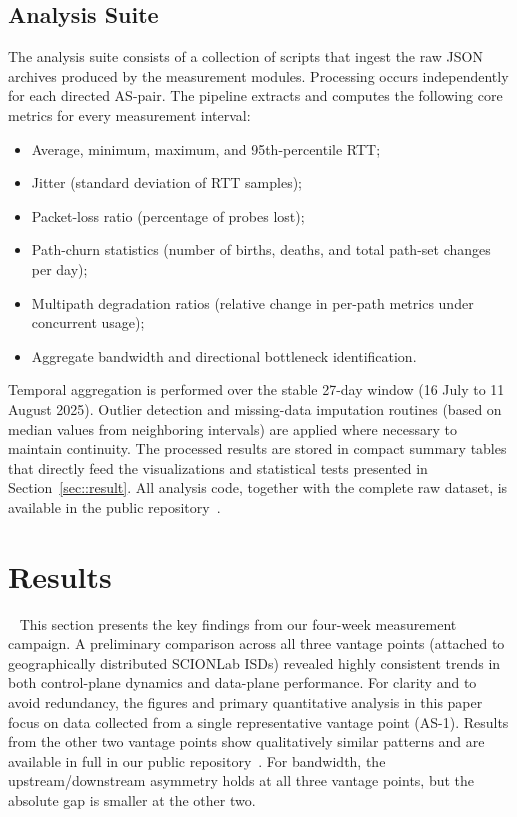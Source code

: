 \documentclass[pdflatex,sn-vancouver-num]{sn-jnl}%
\theoremstyle{thmstyleone}%
\theoremstyle{thmstyletwo}%
\theoremstyle{thmstylethree}%
\begin{document}
\subsection{Analysis Suite}
    The analysis suite consists of a collection of scripts that ingest the raw JSON archives produced by the measurement modules. Processing occurs independently for each directed AS-pair. The pipeline extracts and computes the following core metrics for every measurement interval:
    \begin{itemize}
    \item Average, minimum, maximum, and 95th-percentile RTT;
    \item Jitter (standard deviation of RTT samples);
    \item Packet-loss ratio (percentage of probes lost);
    \item Path-churn statistics (number of births, deaths, and total path-set changes per day);
    \item Multipath degradation ratios (relative change in per-path metrics under concurrent usage);
    \item Aggregate bandwidth and directional bottleneck identification.
\end{itemize}
    Temporal aggregation is performed over the stable 27-day window (16 July to 11 August 2025). Outlier detection and missing-data imputation routines (based on median values from neighboring intervals) are applied where necessary to maintain continuity. The processed results are stored in compact summary tables that directly feed the visualizations and statistical tests presented in Section~\ref{sec::result}. All analysis code, together with the complete raw dataset, is available in the public repository~\cite{github-scionlab-data}.


\section{Results}~\label{sec::result}
This section presents the key findings from our four-week measurement campaign. A preliminary comparison across all three vantage points (attached to geographically distributed SCIONLab ISDs) revealed highly consistent trends in both control-plane dynamics and data-plane performance. For clarity and to avoid redundancy, the figures and primary quantitative analysis in this paper focus on data collected from a single representative vantage point (AS-1). Results from the other two vantage points show qualitatively similar patterns and are available in full in our public repository~\cite{github-scionlab-data}. For bandwidth, the upstream/downstream asymmetry holds at all three vantage points, but the absolute gap is smaller at the other two.
\end{document}
